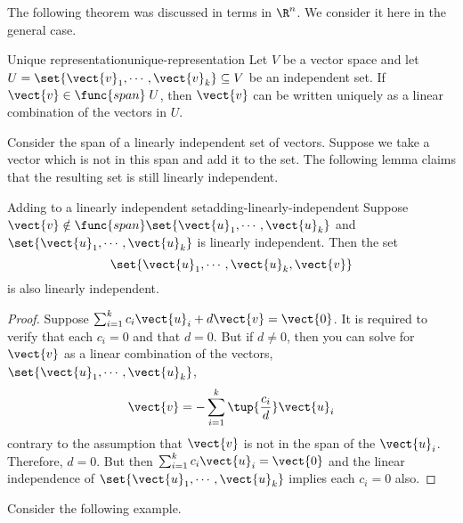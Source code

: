 The following theorem was discussed in terms in $\R^n$. We consider it here in the general case.

\begin{theorem}{Unique representation}{unique-representation}
Let $V$ be a vector space and let $U = \set{\vect{v}_1, \cdots, \vect{v}_k } \subseteq V$ be an independent set. If $\vect{v} \in \func{span} \;U$, then $\vect{v}$ can be written uniquely as a linear combination of the vectors in $U$. 
\end{theorem}

Consider the span of a linearly independent set of vectors. Suppose we take a vector which is not in this span and add it to the set. The following lemma claims that the resulting set is still linearly independent. 

\begin{lemma}{Adding to a linearly independent set}{adding-linearly-independent}
Suppose $\vect{v}\notin \func{span}\set{\vect{u}_{1},\cdots ,\vect{u}_{k}} $ and $\set{\vect{u}_{1},\cdots ,
\vect{u}_{k}} $ is linearly independent. Then the set
\begin{equation*}
\set{\vect{u}_{1},\cdots ,\vect{u}_{k},\vect{v} }
\end{equation*}
is also linearly independent.
\end{lemma}

\begin{proof}
Suppose $\sum_{i=1}^{k}c_{i}\vect{u}_{i}+d\vect{v}=
\vect{0}$. It is required to verify that each $c_{i}=0$ and that $d=0$.
But if $d\neq 0$, then you can solve for $\vect{v}$ as a linear
combination of the vectors, $\set{\vect{u}_{1},\cdots ,\vect{u}
_{k}}$, 
\begin{equation*}
\vect{v}=-\sum_{i=1}^{k}\tup{\frac{c_{i}}{d}} \vect{u}_{i}
\end{equation*}
contrary to the assumption that $\vect{v}$ is not in the span of the $\vect{u}_{i}$. Therefore, $d=0$. But then $\sum_{i=1}^{k}c_{i}
\vect{u}_{i}=\vect{0}$ and the linear independence of $\set{\vect{u}
_{1},\cdots ,\vect{u}_{k}} $ implies each $c_{i}=0$ also. 
\end{proof}

Consider the following example.

